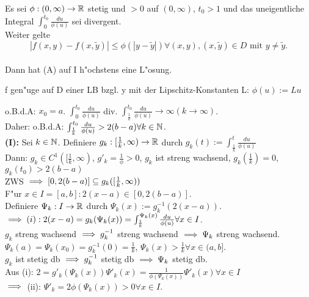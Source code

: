 \documentclass{article}
\begin{document}
\begin{satz}
Es sei $\phi:(0,\infty)\to\mathbb{R}$ stetig und $>0$ auf $(0,\infty)$, $t_0>1$ und das uneigentliche Integral $\int_0^{t_0}\frac{du}{\phi(u)}$ sei divergent.\\
Weiter gelte \[|f(x,y)-f(x,\tilde y)|\le\phi(|y-\tilde y|) \forall (x,y),(x,\tilde y) \in D\text{ mit } y\ne \tilde y.\] \\
Dann hat (A) auf I h"ochstens eine L"osung.
\end{satz}
\begin{bemerkung}
f gen"uge auf D einer LB bzgl. y mit der Lipschitz-Konstanten L: $\phi(u):=Lu$
\end{bemerkung}
\begin{beweis}
o.B.d.A: $x_0=a$. $\int_0^{t_0}\frac{du}{\phi(u)}$ div. \folgt  $\int_{\frac{1}{k}}^{t_0}\frac{du}{\phi(u)}\to\infty(k\to\infty)$.\\
Daher: o.B.d.A:   $\int_{\frac{1}{k}}^{t_0}\frac{du}{\phi(u)} > 2(b-a)\forall k\in\mathbb{N}$.\\

\textbf{(I):} Sei $k\in\mathbb{N}$. Definiere $g_k:[\frac{1}{k},\infty)\to\mathbb{R}$ durch $g_k(t):= \int_{\frac{1}{k}}^{t}\frac{du}{\phi(u)}$\\
Dann: $g_k \in C^1([\frac{1}{k},\infty)$, $g'_k=\frac{1}{\phi}>0$, $g_k$ ist streng wachsend, $g_k(\frac{1}{k})=0$, $g_k(t_0)>2(b-a)$\\
ZWS $\implies [0,2(b-a)] \subseteq g_k([\frac{1}{k},\infty))$\\
F"ur $x \in I = [a,b]:2(x-a) \in [0,2(b-a)]$.\\ Definiere $\Psi_k:I\to\mathbb{R}$ durch $\Psi_k(x):=g_k^{-1}(2(x-a))$.\\
$\implies (i): 2(x-a) = g_k(\Psi_k(x)) = \int_{\frac{1}{k}}^{\Psi_k(x)}\frac{du}{\phi(u)} \forall x \in I$.\\
$g_k$ streng wachsend $\implies g_k^{-1}$ streng wachsend $\implies \Psi_k$ streng wachsend.\\
$\Psi_k(a)=\Psi_k(x_0)=g_k^{-1}(0)=\frac{1}{k}$, $\Psi_k(x)>\frac{1}{k}\forall x \in (a,b]$.\\
$g_k$ ist stetig db $\implies g_k^{-1}$ stetig db $\implies \Psi_k$ stetig db.\\
Aus (i): $2 =g'_k(\Psi_k(x))\Psi'_k(x) = \frac{1}{\phi(\Psi_k(x))}\Psi'_k(x)\forall x \in I$\\
$\implies$ (ii): $\Psi'_k=2\phi(\Psi_k(x))>0\forall x \in I$.\\


\end{beweis}
\end{document}
